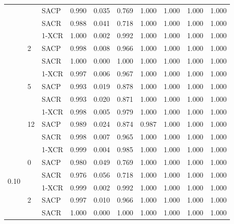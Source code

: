 \begin{longtable}[c]{@{}llllllllll@{}}
                        &                     & SACP   & 0.990 & 0.035 & 0.769 & 1.000 & 1.000 & 1.000 & 1.000 \\
                        &                     & SACR   & 0.988 & 0.041 & 0.718 & 1.000 & 1.000 & 1.000 & 1.000 \\* \cmidrule(l){3-10} 
                        & \multirow{3}{*}{2}  & 1-XCR  & 1.000 & 0.002 & 0.992 & 1.000 & 1.000 & 1.000 & 1.000 \\
                        &                     & SACP   & 0.998 & 0.008 & 0.966 & 1.000 & 1.000 & 1.000 & 1.000 \\
                        &                     & SACR   & 1.000 & 0.000 & 1.000 & 1.000 & 1.000 & 1.000 & 1.000 \\* \cmidrule(l){3-10} 
                        & \multirow{3}{*}{5}  & 1-XCR  & 0.997 & 0.006 & 0.967 & 1.000 & 1.000 & 1.000 & 1.000 \\
                        &                     & SACP   & 0.993 & 0.019 & 0.878 & 1.000 & 1.000 & 1.000 & 1.000 \\
                        &                     & SACR   & 0.993 & 0.020 & 0.871 & 1.000 & 1.000 & 1.000 & 1.000 \\* \cmidrule(l){3-10} 
                        & \multirow{3}{*}{12} & 1-XCR  & 0.998 & 0.005 & 0.979 & 1.000 & 1.000 & 1.000 & 1.000 \\
                        &                     & SACP   & 0.989 & 0.024 & 0.874 & 0.987 & 1.000 & 1.000 & 1.000 \\
                        &                     & SACR   & 0.998 & 0.007 & 0.965 & 1.000 & 1.000 & 1.000 & 1.000 \\* \cmidrule(l){2-10} 
\multirow{12}{*}{0.10} & \multirow{3}{*}{0}  & 1-XCR  & 0.999 & 0.004 & 0.985 & 1.000 & 1.000 & 1.000 & 1.000 \\
                        &                     & SACP   & 0.980 & 0.049 & 0.769 & 1.000 & 1.000 & 1.000 & 1.000 \\
                        &                     & SACR   & 0.976 & 0.056 & 0.718 & 1.000 & 1.000 & 1.000 & 1.000 \\* \cmidrule(l){3-10} 
                        & \multirow{3}{*}{2}  & 1-XCR  & 0.999 & 0.002 & 0.992 & 1.000 & 1.000 & 1.000 & 1.000 \\
                        &                     & SACP   & 0.997 & 0.010 & 0.966 & 1.000 & 1.000 & 1.000 & 1.000 \\
                        &                     & SACR   & 1.000 & 0.000 & 1.000 & 1.000 & 1.000 & 1.000 & 1.000 \\* \cmidrule(l){3-10} 

\end{longtable}
